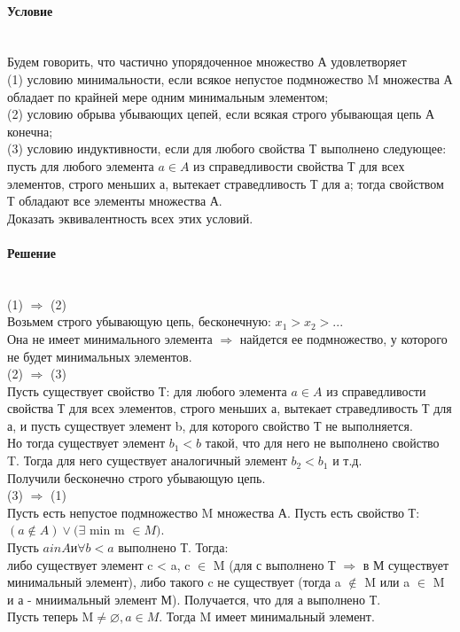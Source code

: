 \documentclass[a4paper,12pt]{article}
\begin{document}
\paragraph*{Условие}\mbox{}\\
Будем говорить, что частично упорядоченное множество А удовлетворяет \\
(1) условию минимальности, если всякое непустое подмножество M множества А обладает по крайней мере одним минимальным элементом;\\
(2) условию обрыва убывающих цепей, если всякая строго убывающая цепь А конечна;\\
(3) условию индуктивности, если для любого свойства Т выполнено следующее:\\
пусть для любого элемента $a \in A$ из справедливости свойства Т для всех элементов, строго меньших а, вытекает страведливость Т для а; тогда свойством Т обладают все элементы множества А.\\
Доказать эквивалентность всех этих условий.
\paragraph*{Решение}\mbox{}\\
(1) $\Rightarrow$ (2)\\
Возьмем строго убывающую цепь, бесконечную: $x_1 > x_2 > ...$\\
Она не имеет минимального элемента $\Rightarrow$ найдется ее подмножество, у которого не будет минимальных элементов.\\
(2) $\Rightarrow$ (3)\\
Пусть существует свойство Т: для любого элемента $a \in A$ из справедливости свойства Т для всех элементов, строго меньших а, вытекает страведливость Т для а, и пусть существует элемент b, для которого свойство Т не выполняется.\\
Но тогда существует элемент $b_1 < b$ такой, что для него не выполнено свойство T. Тогда для него существует аналогичный элемент $b_2 < b_1$ и т.д.\\
Получили бесконечно строго убывающую цепь.\\
(3) $\Rightarrow$ (1)\\
Пусть есть непустое подмножество M множества А. Пусть есть свойство Т: $ (a \notin A) \vee (\exists$  min  m $\in M )$.\\
Пусть $a in A и \forall b < a $  выполнено Т. Тогда:\\
либо существует элемент c < a, c $\in$ M (для с выполнено Т $\Rightarrow$ в М существует минимальный элемент),  либо такого c не существует (тогда a $\notin$ M или a $\in$ M и а - мниимальный элемент М). Получается, что для а выполнено Т.\\
Пусть теперь M$\neq \varnothing, a \in M$. Тогда M имеет минимальный элемент.
\end{document}
